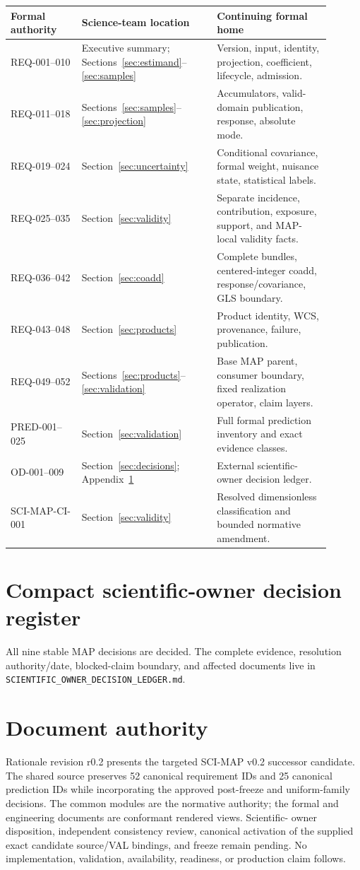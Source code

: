 \documentclass[10pt]{article}
\newcommand{\code}[1]{\nolinkurl{#1}}
\begin{document}
\begin{longtable}{L{0.20\linewidth}L{0.38\linewidth}L{0.32\linewidth}}
\toprule Formal authority & Science-team location & Continuing formal home \\
\midrule
REQ-001--010 & Executive summary; Sections~\ref{sec:estimand}--\ref{sec:samples} & Version, input, identity, projection, coefficient, lifecycle, admission.\\
REQ-011--018 & Sections~\ref{sec:samples}--\ref{sec:projection} & Accumulators, valid-domain publication, response, absolute mode.\\
REQ-019--024 & Section~\ref{sec:uncertainty} & Conditional covariance, formal weight, nuisance state, statistical labels.\\
REQ-025--035 & Section~\ref{sec:validity} & Separate incidence, contribution, exposure, support, and MAP-local validity facts.\\
REQ-036--042 & Section~\ref{sec:coadd} & Complete bundles, centered-integer coadd, response/covariance, GLS boundary.\\
REQ-043--048 & Section~\ref{sec:products} & Product identity, WCS, provenance, failure, publication.\\
REQ-049--052 & Sections~\ref{sec:products}--\ref{sec:validation} & Base MAP parent, consumer boundary, fixed realization operator, claim layers.\\
PRED-001--025 & Section~\ref{sec:validation} & Full formal prediction inventory and exact evidence classes.\\
OD-001--009 & Section~\ref{sec:decisions}; Appendix~\ref{app:decisions} & External scientific-owner decision ledger.\\
SCI-MAP-CI-001 & Section~\ref{sec:validity} & Resolved dimensionless classification and bounded normative amendment.\\
\bottomrule
\end{longtable}

\clearpage
\section{Compact scientific-owner decision register}\label{app:decisions}
All nine stable MAP decisions are decided. The complete evidence, resolution
authority/date, blocked-claim boundary, and affected documents live in
\code{SCIENTIFIC_OWNER_DECISION_LEDGER.md}.



\section{Document authority}
Rationale revision r0.2 presents the targeted SCI-MAP v0.2 successor
candidate. The shared source preserves 52 canonical requirement IDs and 25
canonical prediction IDs while incorporating the approved post-freeze and
uniform-family decisions. The common modules are the normative authority; the
formal and engineering documents are conformant rendered views. Scientific-
owner disposition, independent consistency review, canonical activation of
the supplied exact candidate source/VAL bindings, and freeze remain pending.
No implementation, validation, availability,
readiness, or production claim follows.
\end{document}
